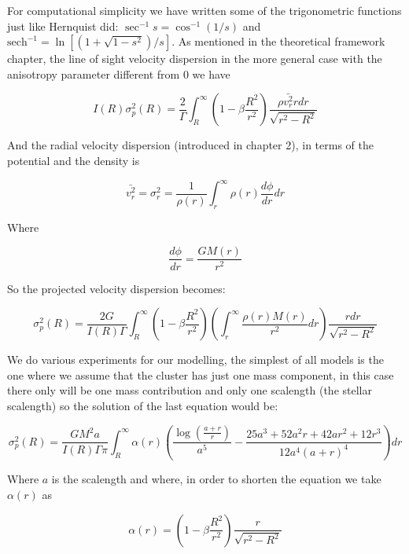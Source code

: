 For computational simplicity we have written some of the trigonometric functions just like Hernquist did: $\sec^{-1}s = \cos^{-1}(1/s)$ and $\text{sech}^{-1} = \ln[(1+\sqrt{1-s^{2}})/s]$. As mentioned in the theoretical framework chapter, the line of sight velocity dispersion in the more general case with the anisotropy parameter different from 0 we have

\begin{equation}
I(R)\sigma_{p}^{2}(R)=\frac{2}{\Gamma}\int_{R}^{\infty}\left(1-\beta\frac{R^{2}}{r^{2}}\right)\frac{\rho\bar{v_{r}^{2}}rdr}{\sqrt{r^{2}-R^{2}}}
\end{equation}

And the radial velocity dispersion (introduced in chapter 2), in terms of the potential and the density is

\begin{equation}
\bar{v_{r}^{2}}=\sigma_{r}^{2}=\frac{1}{\rho(r)}\int_{r}^{\infty}\rho(r)\frac{d\phi}{dr}dr
\end{equation}

Where 

\begin{equation}
\frac{d\phi}{dr}=\frac{GM(r)}{r^{2}}
\end{equation}

So the projected velocity dispersion becomes:

\begin{equation}
\sigma_{p}^{2}(R)=\frac{2G}{I(R)\Gamma}\int_{R}^{\infty}\left(1-\beta\frac{R^{2}}{r^{2}}\right)\left(\int_{r}^{\infty}\frac{\rho(r)M(r)}{r^{2}}dr\right)\frac{rdr}{\sqrt{r^{2}-R^{2}}}
\end{equation}

We do various experiments for our modelling, the simplest of all models is the one where we assume that the cluster has just one mass component, in this case there only will be one mass contribution and only one scalength (the stellar scalength) so the solution of the last equation would be:

\begin{equation}
\sigma_{p}^{2}(R)=\frac{GM^{2}a}{I(R)\Gamma\pi}\int_{R}^{\infty}\alpha(r)\left(\frac{\log{\left(\frac{a+r}{r}\right)}}{a^{5}}-\frac{25a^{3}+52a^{2}r+42ar^{2}+12r^{3}}{12a^{4}\left(a+r\right)^{4}}\right)dr
\end{equation}

Where $a$ is the scalength and where, in order to shorten the equation we take $\alpha(r)$ as 

\begin{equation}
\alpha(r)=\left(1-\beta\frac{R^{2}}{r^{2}}\right)\frac{r}{\sqrt{r^{2}-R^{2}}}
\end{equation}

